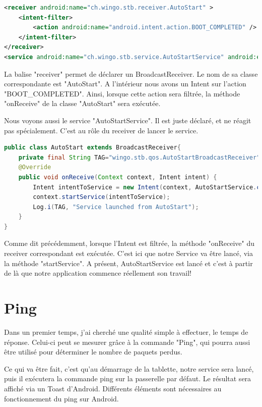 \begin{lstlisting}[language=XML, caption={Broadcast Receiver et Service dans AndroidManifest.xml}]
<receiver android:name="ch.wingo.stb.receiver.AutoStart" >
	<intent-filter>
		<action android:name="android.intent.action.BOOT_COMPLETED" />
	</intent-filter>
</receiver>
<service android:name="ch.wingo.stb.service.AutoStartService" android:enabled="true" />
\end{lstlisting}

La balise "receiver" permet de déclarer un BroadcastReceiver. Le nom de sa classe correspondante est "AutoStart". A l'intérieur nous avons un Intent sur l'action "BOOT\_COMPLETED". Ainsi, lorsque cette action sera filtrée, la méthode "onReceive" de la classe "AutoStart" sera exécutée.

Nous voyons aussi le service "AutoStartService". Il est juste déclaré, et ne réagit pas spécialement. C'est au rôle du receiver de lancer le service.

\begin{lstlisting}[language=Java, caption={Classe AutoStart.java}]
public class AutoStart extends BroadcastReceiver{
	private final String TAG="wingo.stb.qos.AutoStartBroadcastReceiver";
	@Override
	public void onReceive(Context context, Intent intent) {
		Intent intentToService = new Intent(context, AutoStartService.class);
		context.startService(intentToService);
		Log.i(TAG, "Service launched from AutoStart");
	}	
}
\end{lstlisting}

Comme dit précédemment, lorsque l'Intent est filtrée, la méthode "onReceive" du receiver correspondant est exécutée. C'est ici que notre Service va être lancé, via la méthode "startService". A présent, AutoStartService est lancé et c'est à partir de là que notre application commence réellement son travail!

\section{Ping}
Dans un premier temps, j'ai cherché une qualité simple à effectuer, le temps de réponse. Celui-ci peut se mesurer grâce à la commande "Ping", qui pourra aussi être utilisé pour déterminer le nombre de paquets perdus.

\medskip

Ce qui va être fait, c'est qu'au démarrage de la tablette, notre service sera lancé, puis il exécutera la commande ping sur la passerelle par défaut. Le résultat sera affiché via un Toast d'Android. Différents éléments sont nécessaires au fonctionnement du ping sur Android.

